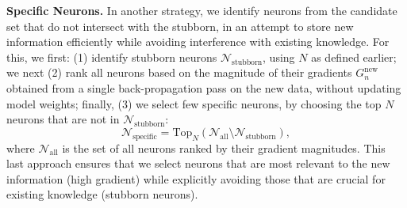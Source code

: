 \noindent \textbf{Specific Neurons.} 
In another strategy, we identify neurons from the candidate set that do not intersect with the stubborn, in an attempt to store new information efficiently while avoiding interference with existing knowledge. For this, we first: (1) identify stubborn neurons $\mathcal{N}_{\text{stubborn}}$, using  $N$ as defined earlier; we next (2) rank all neurons based on the magnitude of their gradients $G_n^{\text{new}}$ obtained from a single back-propagation pass on the new data, without updating model weights; finally, (3) we select few specific neurons, by choosing the top $N$ neurons that are not in $\mathcal{N}_{\text{stubborn}}$:
    \[
    \mathcal{N}_{\text{specific}} = \text{Top}_N(\mathcal{N}_{\text{all}} \setminus \mathcal{N}_{\text{stubborn}}),
    \]
    where $\mathcal{N}_{\text{all}}$ is the set of all neurons ranked by their gradient magnitudes.
    This last approach ensures that we select neurons that are most relevant to the new information (high gradient) while explicitly avoiding those that are crucial for existing knowledge (stubborn neurons).





